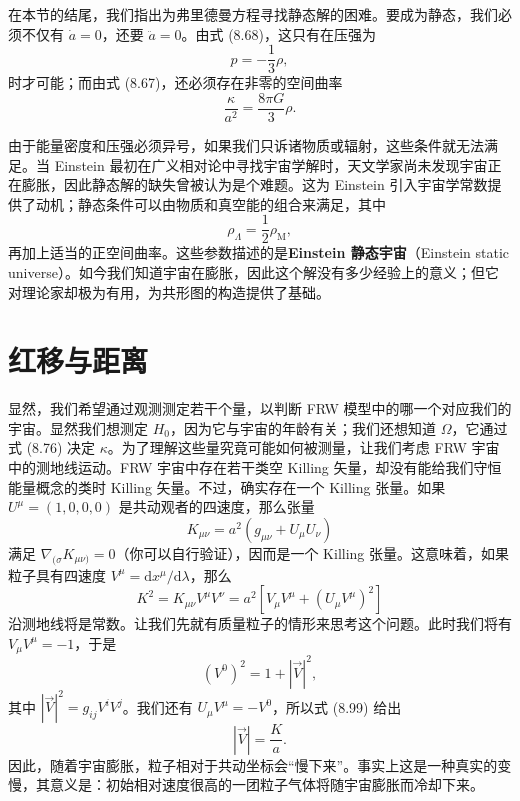 在本节的结尾，我们指出为弗里德曼方程寻找静态解的困难。要成为静态，我们必须不仅有 $\dot{a}=0$，还要 $\ddot{a}=0$。由式 (8.68)，这只有在压强为
\begin{equation*}
p = -\frac{1}{3}\rho,
\tag{8.95}
\end{equation*}
时才可能；而由式 (8.67)，还必须存在非零的空间曲率
\begin{equation*}
\frac{\kappa}{a^{2}} = \frac{8\pi G}{3}\rho.
\tag{8.96}
\end{equation*}

由于能量密度和压强必须异号，如果我们只诉诸物质或辐射，这些条件就无法满足。当 Einstein 最初在广义相对论中寻找宇宙学解时，天文学家尚未发现宇宙正在膨胀，因此静态解的缺失曾被认为是个难题。这为 Einstein 引入宇宙学常数提供了动机；静态条件可以由物质和真空能的组合来满足，其中
\begin{equation*}
\rho_{\Lambda} = \frac{1}{2}\rho_{\mathrm{M}},
\tag{8.97}
\end{equation*}
再加上适当的正空间曲率。这些参数描述的是\textbf{Einstein 静态宇宙}（Einstein static universe）。如今我们知道宇宙在膨胀，因此这个解没有多少经验上的意义；但它对理论家却极为有用，为共形图的构造提供了基础。

\section{红移与距离}

显然，我们希望通过观测测定若干个量，以判断 FRW 模型中的哪一个对应我们的宇宙。显然我们想测定 $H_0$，因为它与宇宙的年龄有关；我们还想知道 $\Omega$，它通过式 (8.76) 决定 $\kappa$。为了理解这些量究竟可能如何被测量，让我们考虑 FRW 宇宙中的测地线运动。FRW 宇宙中存在若干类空 Killing 矢量，却没有能给我们守恒能量概念的类时 Killing 矢量。不过，确实存在一个 Killing 张量。如果 $U^{\mu}=(1,0,0,0)$ 是共动观者的四速度，那么张量
\begin{equation*}
K_{\mu\nu} = a^{2}(g_{\mu\nu} + U_{\mu}U_{\nu})
\tag{8.98}
\end{equation*}
满足 $\nabla_{(\sigma}K_{\mu\nu)}=0$（你可以自行验证），因而是一个 Killing 张量。这意味着，如果粒子具有四速度 $V^{\mu}=\mathrm{d}x^{\mu}/\mathrm{d}\lambda$，那么
\begin{equation*}
K^{2} = K_{\mu\nu}V^{\mu}V^{\nu} = a^{2}[V_{\mu}V^{\mu} + (U_{\mu}V^{\mu})^{2}]
\tag{8.99}
\end{equation*}
沿测地线将是常数。让我们先就有质量粒子的情形来思考这个问题。此时我们将有 $V_{\mu}V^{\mu}=-1$，于是
\begin{equation*}
(V^{0})^{2} = 1 + |\vec{V}|^{2},
\tag{8.100}
\end{equation*}
其中 $|\vec{V}|^{2}=g_{ij}V^{i}V^{j}$。我们还有 $U_{\mu}V^{\mu}=-V^{0}$，所以式 (8.99) 给出
\begin{equation*}
|\vec{V}| = \frac{K}{a}.
\tag{8.101}
\end{equation*}
因此，随着宇宙膨胀，粒子相对于共动坐标会“慢下来”。事实上这是一种真实的变慢，其意义是：初始相对速度很高的一团粒子气体将随宇宙膨胀而冷却下来。


